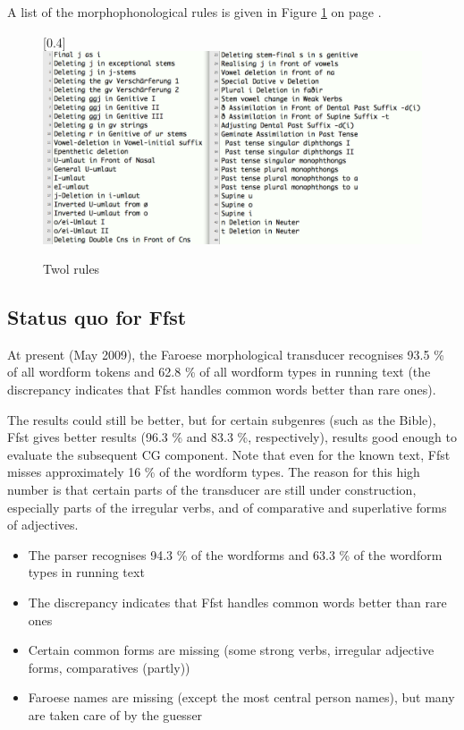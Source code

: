 \documentclass[11pt]{article}
\begin{document}
A list of the morphophonological rules is given in Figure \ref{twolrules} on page \pageref{twolrules}.

\begin{figure}[htbp]
\begin{center}
\scalebox{0.4}[0.4]{\includegraphics{img/twolrules.png}}
\caption{Twol rules}
\label{twolrules}
\end{center}
\end{figure}



\subsection{Status quo for Ffst}


At present (May 2009), the Faroese morphological transducer recognises 93.5 \% of all wordform tokens and 62.8 \% of all wordform types in running text (the discrepancy indicates that Ffst handles common words better than rare ones). 

The results could still be better, but for certain subgenres (such as the Bible), Ffst gives better results (96.3 \% and 83.3 \%, respectively), results good enough to evaluate the subsequent CG component. Note that even for the known text, Ffst misses approximately 16 \% of the wordform types. The reason for this high number is that certain parts of the transducer are still under construction, especially parts of the irregular verbs, and of comparative and superlative forms of adjectives.

\begin{itemize}
\setlength{\itemsep}{-0.2cm}
\item The parser recognises 94.3 \% of the wordforms and 63.3  \% of the wordform types in running text
\item The discrepancy indicates that Ffst handles common words better than rare ones
\item{Certain common forms are missing (some strong verbs, irregular adjective forms, comparatives (partly))}
\item{Faroese names are missing (except the most central person names), but many are taken care of by the guesser}
\end{itemize}
\end{document}
